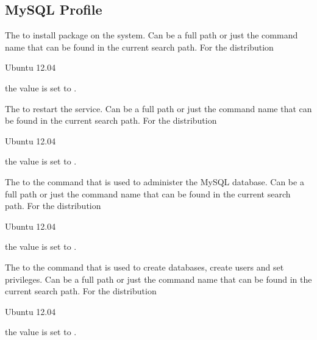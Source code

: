 \label{sec:mysql_profile}
\subsection{MySQL Profile}


The  to install package on the system. Can be a full path or
just the command name that can be found in the current search path. 
For the distribution
\begin{inparaitem}
\item[\TheDistribution{ubuntu}] Ubuntu 12.04
\end{inparaitem}
the value is set to .


The  to restart the service. Can be a full path or
just the command name that can be found in the current search path. 
For the distribution
\begin{inparaitem}
\item[\TheDistribution{ubuntu}] Ubuntu 12.04
\end{inparaitem}
the value is set to .


The  to the  command that is used to administer the 
MySQL database. Can be a full path or
just the command name that can be found in the current search path. 
For the distribution
\begin{inparaitem}
\item[\TheDistribution{ubuntu}] Ubuntu 12.04
\end{inparaitem}
the value is set to .


The  to the  command that is used to create databases,
create users and set privileges. Can be a full path or
just the command name that can be found in the current search path. 
For the distribution
\begin{inparaitem}
\item[\TheDistribution{ubuntu}] Ubuntu 12.04
\end{inparaitem}
the value is set to .

